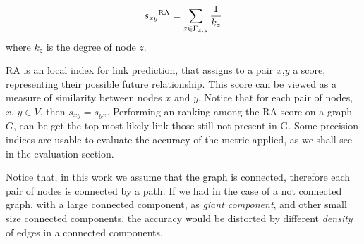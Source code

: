 \begin{equation}
\label{eqn:resource-allocation}
s_{xy}\textsuperscript{RA} = 
\sum\limits_{z\in\Gamma_{x,y}}\frac{1}{k_{z}}
\end{equation}
where $k_{z}$ is the degree of node $z$.

RA is an local index for link prediction, that assigns to a pair $x$,$y$ a score, representing their possible future relationship. This score can be viewed as a measure of similarity between nodes $x$ and $y$. Notice that for each pair of nodes, $x$, $y \in V$, then $s_{xy} = s_{yx}$. Performing an ranking among the RA score on a graph $G$, can be get the top most likely link those still not present in G.
Some precision indices are usable to evaluate the accuracy of the metric applied, as we shall see in the evaluation section.

Notice that, in this work we assume that the graph is connected, therefore each pair of nodes is connected by a path. If we had in the case of a not connected graph, with a large connected component, as \textit{giant component}, and other small size connected components, the accuracy would be distorted by different \textit{density} of edges in a connected components.

